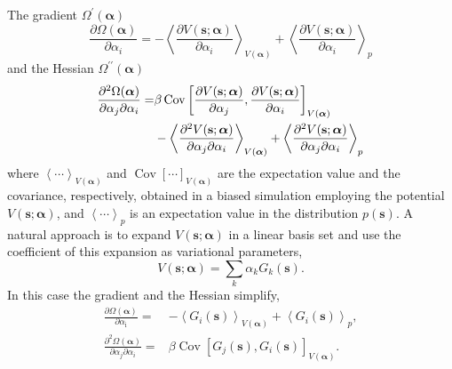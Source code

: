 The gradient $\Omega^\prime(\boldsymbol{\alpha})$
\begin{equation}
    \frac{\partial \Omega(\boldsymbol{\alpha})}{\partial \alpha_{i}}=-\left\langle\frac{\partial V(\mathbf{s} ; \boldsymbol{\alpha})}{\partial \alpha_{i}}\right\rangle_{V(\boldsymbol{\alpha})}+\left\langle\frac{\partial V(\mathbf{s} ; \boldsymbol{\alpha})}{\partial \alpha_{i}}\right\rangle_{p}
\end{equation}
and the Hessian $\Omega^{\prime\prime}(\boldsymbol{\alpha})$
\begin{align} 
    	\frac{\partial^{2} \Omega(\boldsymbol{\alpha})}{\partial \alpha_{j} \partial \alpha_{i}}=& \beta \operatorname{Cov}\left[\frac{\partial V(\mathbf{s} ; \boldsymbol{\alpha})}{\partial \alpha_{j}}, \frac{\partial V(\mathbf{s} ; \boldsymbol{\alpha})}{\partial \alpha_{i}}\right]_{V(\boldsymbol{\alpha})} \notag\\ &-\left\langle\frac{\partial^{2} V(\mathbf{s} ; \boldsymbol{\alpha})}{\partial \alpha_{j} \partial \alpha_{i}}\right\rangle_{V(\boldsymbol{\alpha})}+\left\langle\frac{\partial^{2} V(\mathbf{s} ; \boldsymbol{\alpha})}{\partial \alpha_{j} \partial \alpha_{i}}\right\rangle_{p} 
\end{align}
where $\left<\cdots\right>_{V(\boldsymbol{\alpha})}$ and $\operatorname{Cov}[\cdots]_{V(\boldsymbol{\alpha})}$ are the expectation value and the covariance, respectively, obtained in a biased simulation employing the potential $V(\boldsymbol{\mathbf{s};\alpha})$, and $\left<\cdots\right>_p$ is an expectation value in the distribution $p(\mathbf{s})$. A natural approach is to expand $V(\boldsymbol{\mathbf{s};\alpha})$ in a linear basis set and use the coefficient of this expansion as variational parameters,
\begin{equation}
     V(\boldsymbol{\mathbf{s};\alpha})=\sum_k\alpha_kG_k(\mathbf{s}).
\end{equation}
In this case the gradient and the Hessian simplify,
\begin{align}
    \frac{\partial \Omega(\boldsymbol{\alpha})}{\partial \alpha_{\mathrm{i}}}=&-\left\langle G_i(\mathbf{s})\right\rangle_{V(\boldsymbol{\alpha})}+\left\langle G_i(\mathbf{s})\right\rangle_{p},\\
    \frac{\partial^{2} \Omega(\boldsymbol{\alpha})}{\partial \alpha_j \partial \alpha_i}=&\beta \operatorname{Cov}\left[G_j(\mathbf{s}), G_i(\mathbf{s})\right]_{V(\boldsymbol{\alpha})}.
\end{align}
